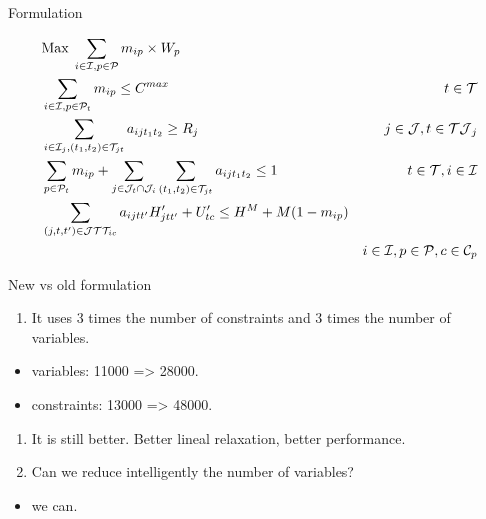 \begin{frame}

  \begin{block}{Formulation}

  \begin{align}
    & \text{Max}\;
    \sum_{i \in \mathcal{I}, p \in \mathcal{P}} m_{ip} \times W_p \\
    & \sum_{i \in \mathcal{I}, p \in \mathcal{P}_{t}} m_{ip} \leq C^{max} 
            & t \in \mathcal{T} \label{eq:capacity1}\\
    & \sum_{i \in \mathcal{I}_j, (t_1, t_2) \in \mathcal{T}_{jt}} a_{ijt_1t_2} \geq R_j
            & j \in \mathcal{J}, t \in \mathcal{TJ}_j  \label{eq:missionres}\\
    & \sum_{p \in \mathcal{P}_{t}} m_{ip} + \sum_{j \in \mathcal{J}_t \cap \mathcal{J}_i} \sum_{(t_1, t_2) \in \mathcal{T}_{jt}} a_{ijt_1t_2} \leq 1 
            & t \in \mathcal{T}, i \in \mathcal{I} \label{eq:state}\\
    & \sum_{(j, t, t') \in \mathcal{J}\mathcal{T}\mathcal{T}_{ic}} a_{ijtt'} H^\prime_{jtt'} + U^{\prime}_{tc} \leq H^M + M (1 - m_{ip}) & \notag \\
      & & i \in \mathcal{I}, p \in \mathcal{P}, c \in \mathcal{C}_p \\
  \end{align}

  \end{block}

\end{frame}

\begin{frame}
  \begin{block}{New vs old formulation}

  \begin{enumerate}[<+->]

  \item
    It uses 3 times the number of constraints and 3 times the number of
    variables.
  \end{enumerate}

  \begin{itemize}[<+->]

  \item
    variables: 11000 =\textgreater{} 28000.
  \item
    constraints: 13000 =\textgreater{} 48000.
  \end{itemize}

  \begin{enumerate}[<+->]

  \item
    It is still better. Better lineal relaxation, better performance.
  \item
    Can we reduce intelligently the number of variables?
  \end{enumerate}

  \begin{itemize}[<+->]

  \item
    we can.
  \end{itemize}

  \end{block}

\end{frame}

